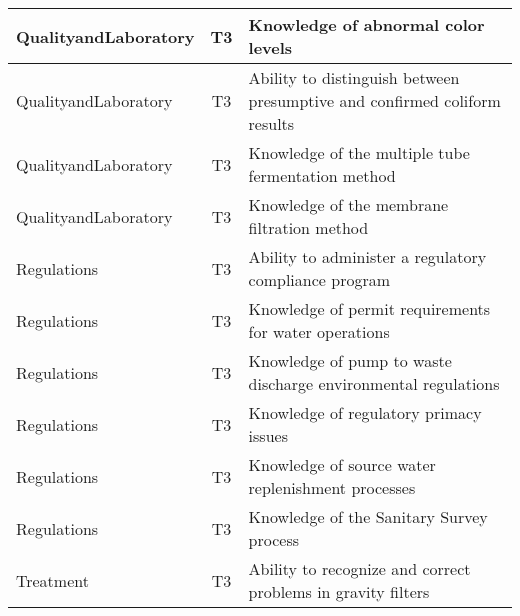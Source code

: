 \documentclass{article}
\begin{document}
\begin{table}[]
\begin{tabular}{|l|c|l|}
QualityandLaboratory                   & T3             & Knowledge of abnormal   color levels                                                                                              \\ \hline
QualityandLaboratory                   & T3             & Ability to   distinguish between presumptive and confirmed coliform results                                                       \\ \hline
QualityandLaboratory                   & T3             & Knowledge of the   multiple tube fermentation method                                                                              \\ \hline
QualityandLaboratory                   & T3             & Knowledge of the   membrane filtration method                                                                                     \\ \hline
Regulations                            & T3             & Ability to administer   a regulatory compliance program                                                                           \\ \hline
Regulations                            & T3             & Knowledge of permit   requirements for water operations                                                                           \\ \hline
Regulations                            & T3             & Knowledge of pump to   waste discharge environmental regulations                                                                  \\ \hline
Regulations                            & T3             & Knowledge of   regulatory primacy issues                                                                                          \\ \hline
Regulations                            & T3             & Knowledge of source   water replenishment processes                                                                               \\ \hline
Regulations                            & T3             & Knowledge of the   Sanitary Survey process                                                                                        \\ \hline
Treatment                              & T3             & Ability to recognize   and correct problems in gravity filters                                                                    \\ \hline

\end{tabular}
\end{table}
\end{document}
